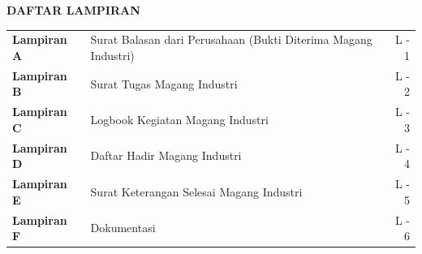 \clearpage
{}
{}

\begin{center}
    \large \textbf{DAFTAR LAMPIRAN}
\end{center}
\vspace{2.5em}

\noindent
\begin{tabularx}{\textwidth}{@{}l X r@{}}
    \textbf{Lampiran A} & Surat Balasan dari Perusahaan (Bukti Diterima Magang Industri) \dotfill & L - 1 \\
    \textbf{Lampiran B} & Surat Tugas Magang Industri \dotfill & L - 2 \\
    \textbf{Lampiran C} & Logbook Kegiatan Magang Industri \dotfill & L - 3 \\
    \textbf{Lampiran D} & Daftar Hadir Magang Industri \dotfill & L - 4 \\
    \textbf{Lampiran E} & Surat Keterangan Selesai Magang Industri \dotfill & L - 5 \\
    \textbf{Lampiran F} & Dokumentasi \dotfill & L - 6 \\
\end{tabularx}
